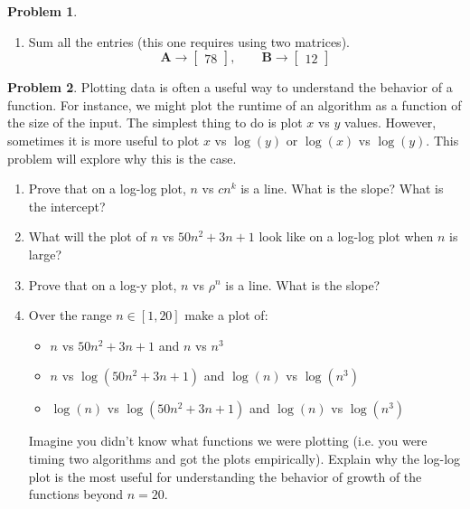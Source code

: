 \documentclass[12pt]{article}
\theoremstyle{definition}
\newtheorem{problem}{Problem}
\renewcommand{\vec}{\mathbf}
\begin{document}
\begin{problem}
\begin{enumerate}
    \item Sum all the entries (this one requires using two matrices).
    \[
        \vec{A} \to  
        \begin{bmatrix}
            78
        \end{bmatrix}
        ,\qquad 
        \vec{B} \to 
        \begin{bmatrix}
            12
        \end{bmatrix}
    \]

    \end{enumerate}
\end{problem}


\begin{problem}
    Plotting data is often a useful way to understand the behavior of a function. For instance, we might plot the runtime of an algorithm as a function of the size of the input.
    The simplest thing to do is plot $x$ vs $y$ values. 
    However, sometimes it is more useful to plot $x$ vs $\log(y)$ or $\log(x)$ vs $\log(y)$.
    This problem will explore why this is the case.

    \begin{enumerate}
        \item Prove that on a log-log plot, $n$ vs $c n^k$ is a line. What is the slope? What is the intercept?
        \item What will the plot of $n$ vs $50n^2 + 3n + 1$ look like on a log-log plot when $n$ is large?
        \item Prove that on a log-y plot, $n$ vs $\rho^n$ is a line. What is the slope?
        \item Over the range $n\in[1,20]$ make a plot of:
        \begin{itemize}
            \item  $n$ vs $50n^2+3n+1$ and $n$ vs $n^3$ 
            \item $n$ vs $\log(50n^2+3n+1)$ and $\log(n)$ vs $\log(n^3)$
            \item $\log(n)$ vs $\log(50n^2+3n+1)$ and $\log(n)$ vs $\log(n^3)$
        \end{itemize}
        
        Imagine you didn't know what functions we were plotting (i.e. you were timing two algorithms and got the plots empirically). 
        Explain why the log-log plot is the most useful for understanding the behavior of growth of the functions beyond $n=20$.
    \end{enumerate}

\end{problem}
\end{document}
